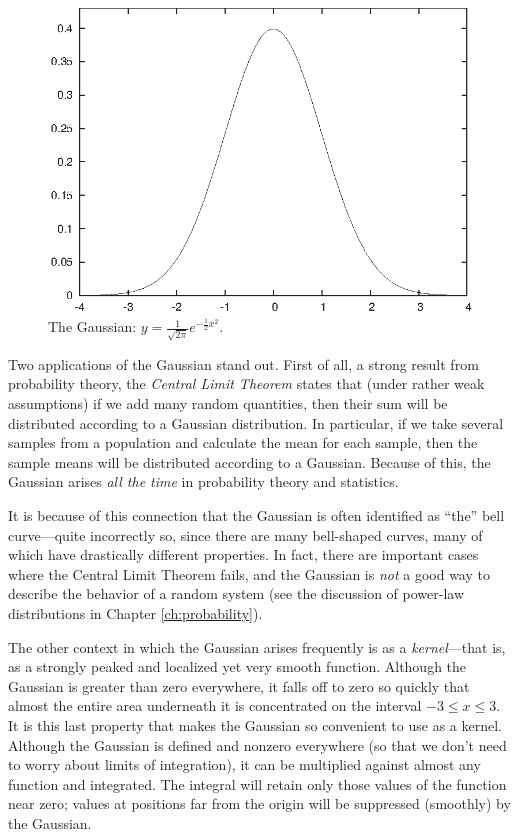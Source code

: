 \begin{figure}
  \centerline{\includegraphics{img/gausspdf}}
  \caption{The Gaussian: 
    $y = \frac{1}{\sqrt{2 \pi}} e^{-\frac{1}{2}x^2}$.}
  \label{fig:gausspdf} 
\end{figure} 

Two applications of the Gaussian stand out. First of all, a strong
result from probability theory, the \emph{Central Limit Theorem} 
states that (under rather weak assumptions) if we add many random
quantities, then their sum will be distributed according to a Gaussian
distribution. In particular, if we take several samples from a
population and calculate the mean for each sample, then the sample
means will be distributed according to a Gaussian. Because of this,
the Gaussian arises \emph{all the time} in probability theory and
statistics.

It is because of this connection that the Gaussian is often identified
as ``the'' bell curve---quite incorrectly so, since there are many
bell-shaped curves, many of which have drastically different\vadjust{\pagebreak}
properties. In fact, there are important cases where the Central Limit
Theorem fails, and the Gaussian is \emph{not} a good way to describe
the behavior of a random system (see the discussion of power-law
distributions in Chapter \ref{ch:probability}).

The other context in which the Gaussian arises frequently is as a
\emph{kernel}---that is, as a strongly peaked and localized yet very
smooth function. Although the Gaussian is greater than zero
everywhere, it falls off to zero so quickly that almost the entire
area underneath it is concentrated on the interval $-3 \le x \le 3$.
It is this last property that makes the Gaussian so convenient to use
as a kernel.  Although the Gaussian is defined and nonzero everywhere
(so that we don't need to worry about limits of integration), it can
be multiplied against almost any function and integrated. The integral
will retain only those values of the function near zero; values at
positions far from the origin will be suppressed (smoothly) by the
Gaussian.

